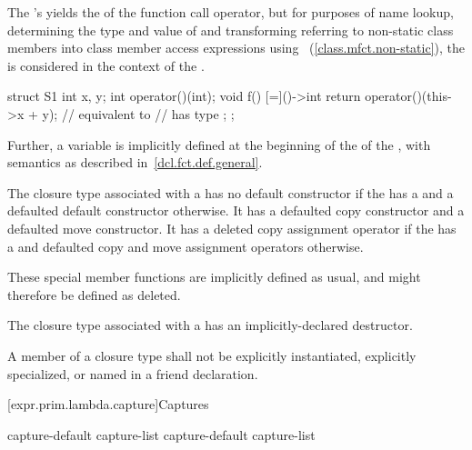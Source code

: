 \pnum
The 's  yields the
 of the function call operator, but for
purposes of name lookup, determining the type and value of
 and transforming 
referring to non-static class members into class member access expressions using
~(\ref{class.mfct.non-static}), the  is
considered in the context of the .
\begin{example}
\begin{codeblock}
struct S1 {
  int x, y;
  int operator()(int);
  void f() {
    [=]()->int {
      return operator()(this->x + y);   // equivalent to 
                                        //  has type 
    };
  }
};
\end{codeblock}
\end{example}
Further, a variable  is implicitly defined at the beginning of
the  of the ,
with semantics as described in~\ref{dcl.fct.def.general}.

\pnum
The closure type associated with a  has no
default constructor
if the  has a 
and a defaulted default constructor otherwise.
It has a defaulted copy constructor and a defaulted move constructor.
It has a deleted copy assignment operator if the 
has a  and defaulted copy and move assignment
operators otherwise.
\begin{note}
These special member functions are implicitly defined as
usual, and might therefore be defined as deleted.
\end{note}

\pnum
The closure type associated with a  has an
implicitly-declared destructor.

\pnum
A member of a closure type shall not be
explicitly instantiated,
explicitly specialized, or
named in a friend declaration.

[expr.prim.lambda.capture]{Captures}%

\begin{bnf}
\br
    capture-default\br
    capture-list\br
    capture-default \terminal{,} capture-list
\end{bnf}

